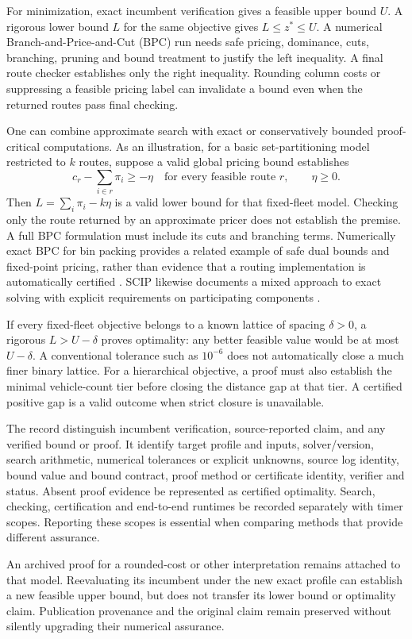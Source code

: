 For minimization, exact incumbent verification gives a feasible upper bound $U$. A rigorous lower bound $L$ for the same objective gives $L\leq z^*\leq U$. A numerical Branch-and-Price-and-Cut (BPC) run needs safe pricing, dominance, cuts, branching, pruning and bound treatment to justify the left inequality. A final route checker establishes only the right inequality. Rounding column costs or suppressing a feasible pricing label can invalidate a bound even when the returned routes pass final checking.

One can combine approximate search with exact or conservatively bounded proof-critical computations. As an illustration, for a basic set-partitioning model restricted to $k$ routes, suppose a valid global pricing bound establishes
\[
c_r-\sum_{i\in r}\pi_i\geq-\eta\quad\text{for every feasible route }r,\qquad\eta\geq0.
\]
Then $L=\sum_i\pi_i-k\eta$ is a valid lower bound for that fixed-fleet model. Checking only the route returned by an approximate pricer does not establish the premise. A full BPC formulation must include its cuts and branching terms. Numerically exact BPC for bin packing provides a related example of safe dual bounds and fixed-point pricing, rather than evidence that a routing implementation is automatically certified \autocite{baldacciNumericallyExact2024}. SCIP likewise documents a mixed approach to exact solving with explicit requirements on participating components \autocite{scipExact2026}.

If every fixed-fleet objective belongs to a known lattice of spacing $\delta>0$, a rigorous $L>U-\delta$ proves optimality: any better feasible value would be at most $U-\delta$. A conventional tolerance such as $10^{-6}$ does not automatically close a much finer binary lattice. For a hierarchical objective, a proof must also establish the minimal vehicle-count tier before closing the distance gap at that tier. A certified positive gap is a valid outcome when strict closure is unavailable.

The  record \must{} distinguish incumbent verification, source-reported claim, and any verified bound or proof. It \must{} identify target profile and inputs, solver/version, search arithmetic, numerical tolerances or explicit unknowns, source log identity, bound value and bound contract, proof method or certificate identity, verifier and status. Absent proof evidence \mustnot{} be represented as certified optimality. Search, checking, certification and end-to-end runtimes \should{} be recorded separately with timer scopes. Reporting these scopes is essential when comparing methods that provide different assurance.

An archived proof for a rounded-cost or other interpretation remains attached to that model. Reevaluating its incumbent under the new exact profile can establish a new feasible upper bound, but does not transfer its lower bound or optimality claim. Publication provenance and the original claim remain preserved without silently upgrading their numerical assurance.
